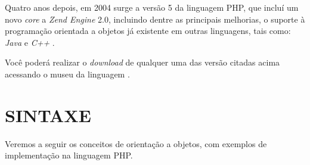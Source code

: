 Quatro anos depois, em 2004 surge a versão 5 da linguagem \acs{PHP}, que incluí
um novo \textit{core} a \textit{Zend Engine} 2.0, incluindo dentre as principais
melhorias, o suporte à programação orientada a objetos já existente
em outras linguagens, tais como: \textit{Java} e \textit{C++}
\cite{phpProgramandoComOrientacaoAObjetos}.

Você poderá realizar o \textit{download} de qualquer uma das versão citadas
acima acessando o museu da linguagem \cite{websitePHPMuseum}.

\section{SINTAXE}

Veremos a seguir os conceitos de orientação a objetos, com exemplos de
implementação na linguagem \acs{PHP}.